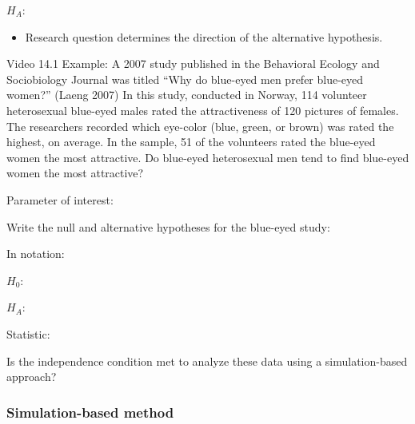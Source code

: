 \documentclass[
]{report}
\providecommand{\tightlist}{%
  \setlength{\itemsep}{0pt}\setlength{\parskip}{0pt}}
\begin{document}
\vspace{0.5in}

\(H_A:\)

\vspace{0.5in}

\begin{itemize}
\tightlist
\item
  Research question determines the direction of the alternative hypothesis.
\end{itemize}

Video 14.1 Example: A 2007 study published in the Behavioral Ecology and Sociobiology Journal was titled ``Why do blue-eyed men prefer blue-eyed women?'' (Laeng 2007) In this study, conducted in Norway, 114 volunteer heterosexual blue-eyed males rated the attractiveness of 120 pictures of females. The researchers recorded which eye-color (blue, green, or brown) was rated the highest, on average. In the sample, 51 of the volunteers rated the blue-eyed women the most attractive. Do blue-eyed heterosexual men tend to find blue-eyed women the most attractive?

Parameter of interest:

\vspace{0.5in}

Write the null and alternative hypotheses for the blue-eyed study:

In notation:

\vspace{1mm}

\(H_0:\)

\vspace{0.2in}

\(H_A:\)

\vspace{0.2in}

Statistic:

\vspace{0.4in}

Is the independence condition met to analyze these data using a simulation-based approach?

\vspace{0.2in}

\newpage

\subsubsection*{Simulation-based method}\label{simulation-based-method-1}
\end{document}
